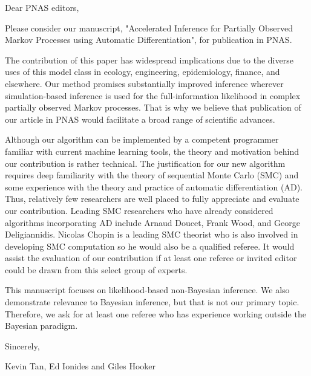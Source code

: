 \documentclass[11pt]{article}
\begin{document}
\noindent Dear PNAS editors,
\newline

Please consider our manuscript, "Accelerated Inference for Partially Observed Markov Processes using Automatic Differentiation", for publication in PNAS.

The contribution of this paper has widespread implications due to the diverse uses of this model class in ecology, engineering, epidemiology, finance, and elsewhere. Our method promises substantially improved inference wherever simulation-based inference is used for the full-information likelihood in complex partially observed Markov processes. That is why we believe that publication of our article in PNAS would facilitate a broad range of scientific advances. 

Although our algorithm can be implemented by a competent programmer familiar with current machine learning tools, the theory and motivation behind our contribution is rather technical. The justification for our new algorithm requires deep familiarity with the theory of sequential Monte Carlo (SMC) and some experience with the theory and practice of automatic differentiation (AD). Thus, relatively few researchers are well placed to fully appreciate and evaluate our contribution. Leading SMC researchers who have already considered algorithms incorporating AD include Arnaud Doucet, Frank Wood, and George Deligiannidis. Nicolas Chopin is a leading SMC theorist who is also involved in developing SMC computation so he would also be a qualified referee. It would assist the evaluation of our contribution if at least one referee or invited editor could be drawn from this select group of experts.

This manuscript focuses on likelihood-based non-Bayesian inference. We also demonstrate relevance to Bayesian inference, but that is not our primary topic. Therefore, we ask for at least one referee who has experience working outside the Bayesian paradigm.

\vspace{3ex}

\noindent Sincerely,

\noindent Kevin Tan, Ed Ionides and Giles Hooker
\end{document}
